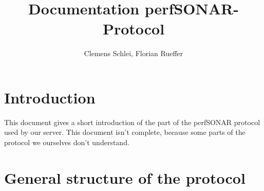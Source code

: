 \documentclass[a4paper,12pt,titlepage,hidelinks,fleqn]{article}
\author{Clemens Schlei, Florian Rueffer}
\title{Documentation perfSONAR-Protocol}
\begin{document}
\lstset{language=XML}
\maketitle
\tableofcontents
\newpage
\section{Introduction}
\begin{flushleft}
This document gives a short introduction of the part of the perfSONAR protocol used by our server. This document isn't complete, because some parts of the protocol we ourselves don't understand.
\end{flushleft}
\section{General structure of the protocol}
\end{document}
